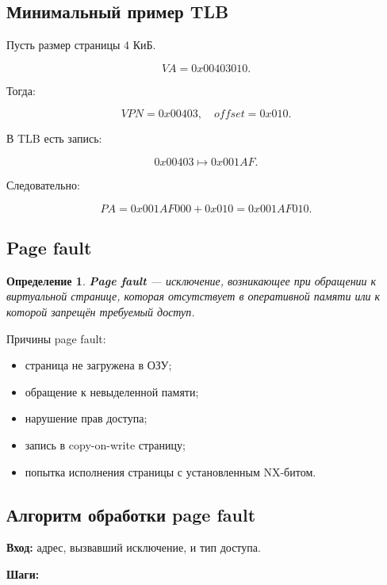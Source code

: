\documentclass[a4paper,12pt]{article}
\newtheorem{definition}{Определение}
\begin{document}
\subsection{Минимальный пример TLB}

Пусть размер страницы $4$ КиБ.

\[
VA = 0x00403010.
\]

Тогда:

\[
VPN = 0x00403,\quad offset = 0x010.
\]

В TLB есть запись:

\[
0x00403 \mapsto 0x001AF.
\]

Следовательно:

\[
PA = 0x001AF000 + 0x010 = 0x001AF010.
\]

\subsection{Page fault}

\begin{definition}
\textbf{Page fault} --- исключение, возникающее при обращении к виртуальной странице, которая отсутствует в оперативной памяти или к которой запрещён требуемый доступ.
\end{definition}

Причины page fault:

\begin{itemize}
    \item страница не загружена в ОЗУ;
    \item обращение к невыделенной памяти;
    \item нарушение прав доступа;
    \item запись в copy-on-write страницу;
    \item попытка исполнения страницы с установленным NX-битом.
\end{itemize}

\subsection{Алгоритм обработки page fault}

\textbf{Вход:} адрес, вызвавший исключение, и тип доступа.

\textbf{Шаги:}
\end{document}
